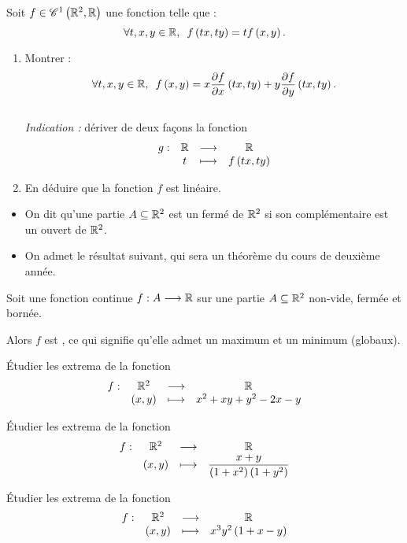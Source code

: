 \begin{exo}[Exercice 7]
Soit \(f\in\mathscr{C}^{1}\left(\mathbb{R}^2,\mathbb{R}\right)\) une fonction telle que : \[\quantifs{\forall t,x,y\in\R}f\paren{tx,ty}=tf\paren{x,y}.\]

\begin{enumerate}
    \item Montrer : \[\quantifs{\forall t,x,y\in\R}f\paren{x,y}=x\pdv{f}{x}\paren{tx,ty}+y\pdv{f}{y}\paren{tx,ty}.\] \\ \textit{Indication :} dériver de deux façons la fonction \[\begin{array}[t]{cccc}g : & \mathbb{R} & \longrightarrow & \mathbb{R} \\ & t & \longmapsto & f\left(tx,ty\right)\end{array}\]
    \item En déduire que la fonction \(f\) est linéaire.
\end{enumerate}
\end{exo}

\begin{rem}
\begin{itemize}
    \item On dit qu'une partie \(A\subseteq\mathbb{R}^2\) est un fermé de \(\mathbb{R}^2\) si son complémentaire est un ouvert de \(\mathbb{R}^2\). \\
    \item On admet le résultat suivant, qui sera un théorème du cours de deuxième année.
\end{itemize}
\end{rem}

\begin{theo}
Soit une fonction continue \(f:A\longrightarrow\mathbb{R}\) sur une partie \(A\subseteq\mathbb{R}^2\) non-vide, fermée et bornée.

Alors \(f\) est , ce qui signifie qu'elle admet un maximum et un minimum (globaux).
\end{theo}

\begin{exo}[Exercice 8]
Étudier les extrema de la fonction \[\begin{array}[t]{cccc}f : & \mathbb{R}^2 & \longrightarrow & \mathbb{R} \\ & \left(x,y\right) & \longmapsto & x^2+xy+y^2-2x-y\end{array}\]
\end{exo}

\begin{exo}[Exercice 9]
Étudier les extrema de la fonction \[\begin{array}[t]{cccc}f : & \mathbb{R}^2 & \longrightarrow & \mathbb{R} \\ & \left(x,y\right) & \longmapsto & \dfrac{x+y}{\left(1+x^2\right)\left(1+y^2\right)}\end{array}\]
\end{exo}

\begin{exo}[Exercice 10]
Étudier les extrema de la fonction \[\begin{array}[t]{cccc}f : & \mathbb{R}^2 & \longrightarrow & \mathbb{R} \\ & \left(x,y\right) & \longmapsto & x^3y^2\left(1+x-y\right)\end{array}\]
\end{exo}

